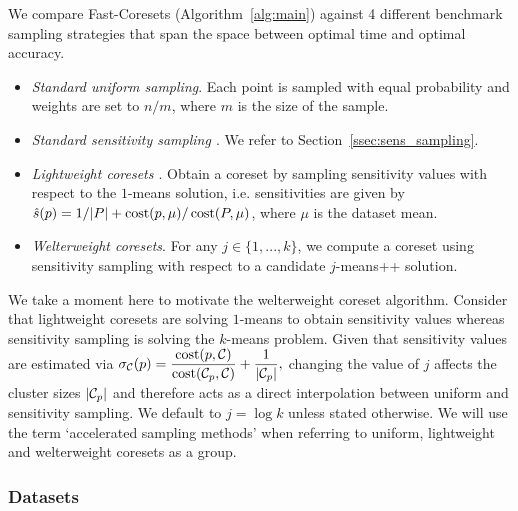 We compare Fast-Coresets (Algorithm~\ref{alg:main}) against 4 different benchmark sampling strategies that span the space between optimal time and optimal
accuracy.
\begin{itemize}
        \item \emph{Standard uniform sampling}. Each point is sampled with equal probability and weights are set to $n / m$, where $m$ is the size of the sample.
        \item \emph{Standard sensitivity sampling \cite{LS10}}. We refer to Section~\ref{ssec:sens_sampling}.
        \item \emph{Lightweight coresets \cite{bachem2018scalable}}. Obtain a coreset by sampling sensitivity values with respect to the $1$-means solution,
            i.e. sensitivities are given by $\hat{s}(p) = 1/|P| + \operatorname{cost}(p, \mu) / \operatorname{cost}(P, \mu)$, where $\mu$ is the dataset mean.
        \item \emph{Welterweight coresets}. For any $j \in \{1,..., k\}$, we compute a coreset using sensitivity sampling with respect to a candidate
            $j$-means++ solution.
\end{itemize}

We take a moment here to motivate the welterweight coreset algorithm.  Consider that lightweight coresets are solving $1$-means to obtain sensitivity
values whereas sensitivity sampling is solving the $k$-means problem. Given that sensitivity values are estimated via $ \sigma_\mathcal C(p) = \dfrac{\operatorname{cost}(p,
\mathcal C)}{\operatorname{cost}(\mathcal C_{p}, \mathcal C)} + \dfrac{1}{|\mathcal C_p|},$ changing the value of $j$ affects the cluster sizes $|\mathcal C_p|$ and therefore acts as a direct
interpolation between uniform and sensitivity sampling.  We default to $j = \log k$ unless stated otherwise. We will use the term `accelerated sampling methods'
when referring to uniform, lightweight and welterweight coresets as a group.

\subsubsection{Datasets}
\label{sssec:datasets}

